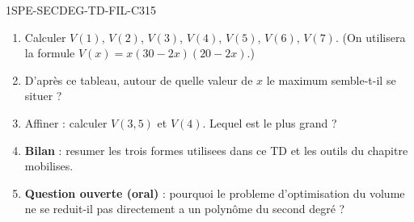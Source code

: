 \begin{exercice}{1SPE-SECDEG-TD-FIL-C}{3}{15}
\begin{enumerate}
  \item Calculer $V(1)$, $V(2)$, $V(3)$, $V(4)$, $V(5)$, $V(6)$, $V(7)$.
    (On utilisera la formule $V(x) = x(30-2x)(20-2x)$.)
  \item D'après ce tableau, autour de quelle valeur de $x$ le maximum semble-t-il se situer ?
  \item Affiner : calculer $V(3{,}5)$ et $V(4)$. Lequel est le plus grand ?
  \item \textbf{Bilan} : resumer les trois formes utilisees dans ce TD et les outils du chapitre mobilises.
  \item \textbf{Question ouverte (oral)} : pourquoi le probleme d'optimisation du volume ne se reduit-il pas directement a un polynôme du second degré ?
\end{enumerate}
\end{exercice}


